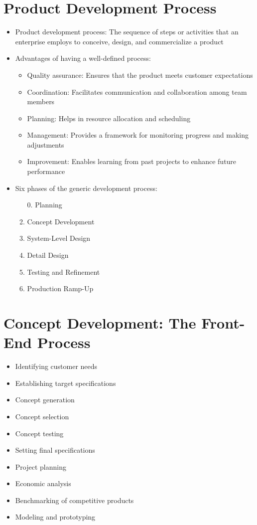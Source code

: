 \documentclass[a4paper,12pt,openany]{book}
\begin{document}
\section{Product Development Process}
\begin{itemize}
    \item Product development process: The sequence of steps or activities that an enterprise employs to conceive, design, and commercialize a product
    \item Advantages of having a well-defined process:
    \begin{itemize}
        \item Quality assurance: Ensures that the product meets customer expectations
        \item Coordination: Facilitates communication and collaboration among team members
        \item Planning: Helps in resource allocation and scheduling
        \item Management: Provides a framework for monitoring progress and making adjustments
        \item Improvement: Enables learning from past projects to enhance future performance
    \end{itemize}
    \item Six phases of the generic development process:
    \begin{enumerate}
        \item[0.] Planning
        \item Concept Development
        \item System-Level Design
        \item Detail Design
        \item Testing and Refinement
        \item Production Ramp-Up
    \end{enumerate}
\end{itemize}

\section{Concept Development: The Front-End Process}
\begin{itemize}
    \item Identifying customer needs
    \item Establishing target specifications
    \item Concept generation
    \item Concept selection
    \item Concept testing
    \item Setting final specifications
    \item Project planning
    \item Economic analysis
    \item Benchmarking of competitive products
    \item Modeling and prototyping
\end{itemize}
\end{document}
